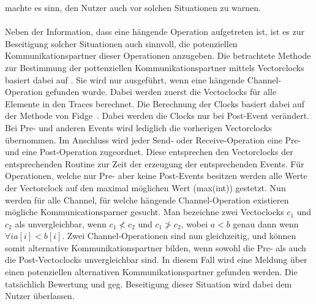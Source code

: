 machte es sinn, den Nutzer auch vor solchen Situationen zu warnen.\\\\
Neben der Information, dass eine hängende Operation aufgetreten ist, ist es zur Beseitigung solcher 
Situationen auch sinnvoll, die potenziellen Kommunikationspartner dieser Operationen anzugeben. 
Die betrachtete Methode zur Bestimmung der pottenziellen Kommunikationspartner mittels Vectorclocks 
basiert dabei auf \cite{PPDP18}. Sie wird nur ausgeführt, wenn eine hängende Channel-Operation gefunden wurde.
Dabei werden zuerst die Vectoclocks für alle Elemente in den Traces 
berechnet. Die Berechnung der Clocks basiert dabei auf der Methode von Fidge~\cite{Fidge}. Dabei werden die
Clocks nur bei Post-Event verändert. Bei Pre- und anderen Events wird lediglich die vorherigen Vectorclocks
übernommen. Im Anschluss wird jeder Send- oder Receive-Operation eine Pre- und eine Post-Operation 
zugeordnet. Diese entsprechen den Vectorclocks der entsprechenden Routine zur Zeit der erzeugung 
der entsprechenden Events. Für Operationen, welche nur Pre- aber keine Post-Events besitzen 
werden alle Werte der Vectorclock auf den maximal möglichen Wert (max(int)) gestetzt. 
Nun werden für alle Channel, für welche hängende Channel-Operation existieren mögliche 
Kommunicationsparner gesucht. Man bezeichne zwei Vectoclocks $c_1$ und $c_2$ als unvergleichbar, wenn 
$c_1 \not < c_2$ und $c_1 \not > c_2$, wobei $a < b$ genau dann wenn $\forall i a[i] < b[i]$. 
Zwei Channel-Operationen sind nun gleichzeitig, und können somit alternative Kommunikationspartner
bilden, wenn sowohl die Pre- als auch die Post-Vectoclocks unvergleichbar sind. In diesem Fall 
wird eine Meldung über einen potenziellen alternativen Kommunikationspartner gefunden werden. 
Die tatsächlich Bewertung und geg. Beseitigung dieser Situation wird dabei dem Nutzer überlassen.
